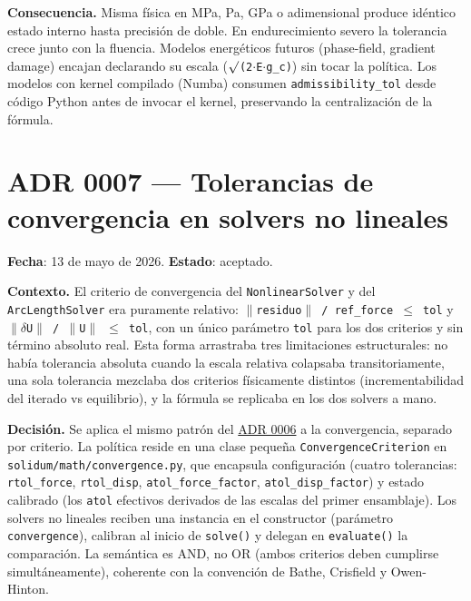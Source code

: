 \documentclass[11pt,oneside]{report}
\begin{document}
\textbf{Consecuencia.} Misma física en MPa, Pa, GPa o adimensional produce idéntico estado interno hasta precisión de doble. En endurecimiento severo la tolerancia crece junto con la fluencia. Modelos energéticos futuros (phase-field, gradient damage) encajan declarando su escala (\texttt{\ensuremath{\surd}(2\ensuremath{\cdot}E\ensuremath{\cdot}g\_c)}) sin tocar la política. Los modelos con kernel compilado (Numba) consumen \texttt{admissibility\_\allowbreak{}tol} desde código Python antes de invocar el kernel, preservando la centralización de la fórmula.

\section{ADR 0007 --- Tolerancias de convergencia en solvers no lineales}
\label{adr:0007}

\textbf{Fecha}: 13 de mayo de 2026. \textbf{Estado}: aceptado.

\textbf{Contexto.} El criterio de convergencia del \texttt{NonlinearSolver} y del \texttt{ArcLengthSolver} era puramente relativo: \texttt{\ensuremath{\|}residuo\ensuremath{\|} /\allowbreak{} ref\_\allowbreak{}force \ensuremath{\le} tol} y \texttt{\ensuremath{\|}\ensuremath{\delta}U\ensuremath{\|} / \ensuremath{\|}U\ensuremath{\|} \ensuremath{\le} tol}, con un único parámetro \texttt{tol} para los dos criterios y sin término absoluto real. Esta forma arrastraba tres limitaciones estructurales: no había tolerancia absoluta cuando la escala relativa colapsaba transitoriamente, una sola tolerancia mezclaba dos criterios físicamente distintos (incrementabilidad del iterado vs equilibrio), y la fórmula se replicaba en los dos solvers a mano.

\textbf{Decisión.} Se aplica el mismo patrón del \hyperref[adr:0006]{ADR 0006} a la convergencia, separado por criterio. La política reside en una clase pequeña \texttt{ConvergenceCriterion} en \texttt{solidum/\allowbreak{}math/\allowbreak{}convergence.\allowbreak{}py}, que encapsula configuración (cuatro tolerancias: \texttt{rtol\_force}, \texttt{rtol\_disp}, \texttt{atol\_\allowbreak{}force\_\allowbreak{}factor}, \texttt{atol\_disp\_factor}) y estado calibrado (los \texttt{atol} efectivos derivados de las escalas del primer ensamblaje). Los solvers no lineales reciben una instancia en el constructor (parámetro \texttt{convergence}), calibran al inicio de \texttt{solve()} y delegan en \texttt{evaluate()} la comparación. La semántica es AND, no OR (ambos criterios deben cumplirse simultáneamente), coherente con la convención de Bathe, Crisfield y Owen-Hinton.
\end{document}
